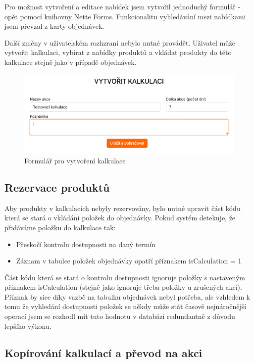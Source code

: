 Pro možnost vytvoření a editace nabídek jsem vytvořil jednoduchý formulář - opět pomocí knihovny Nette Forms. Funkcionalitu vyhledávání mezi nabídkami jsem převzal z karty objednávek.

Další změny v uživatelském rozhzraní nebylo nutné provádět. Uživatel může vytvořit kalkulaci, vybírat z nabídky produktů a vkládat produkty do této kalkulace stejně jako v případě objednávek.

\begin{figure}
    \centering
    \includegraphics[width=0.75\linewidth]{kalkulace-formular.png}
    \caption{Formulář pro vytvoření kalkulace}
    \label{fig:enter-label}
\end{figure}

\subsection{Rezervace produktů}

Aby produkty v kalkulacích nebyly rezervovány, bylo nutné upravit část kódu která se stará o vkládání položek do objednávky. Pokud systém detekuje, že přidáváme položku do kalkulace tak:

\begin{itemize}
    \item Přeskočí kontrolu dostupnosti na daný termín
    \item Záznam v tabulce položek objednávky opatří příznakem isCalculation = 1
\end{itemize}

Část kódu která se stará o kontrolu dostupnosti ignoruje položky s nastaveným příznakem isCalculation (stejně jako ignoruje třeba položky u zrušených akcí). Příznak by sice díky vazbě na tabulku objednávek nebyl potřeba, ale vzhledem k tomu že vyhledání dostupnosti položek se někdy může stát časově nejnáročnější operací jsem se rozhodl mít tuto hodnotu v databází redundantně z důvodu lepšího výkonu.

\subsection{Kopírování kalkulací a převod na akci}

